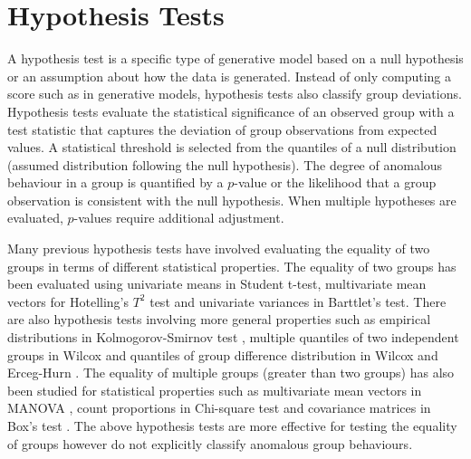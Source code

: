 \section{Hypothesis Tests} 
\label{Sec:H}
 A hypothesis test is a specific type of generative model based on a null hypothesis or an assumption about how the data is generated. Instead of only computing a score such as in generative models, hypothesis tests also classify group deviations.  Hypothesis tests evaluate the statistical significance of an observed group with  a test statistic that captures the deviation of group observations from expected values. A statistical threshold is selected from the quantiles of a null distribution (assumed distribution following the null hypothesis).   The degree of anomalous behaviour in a group is quantified by a $p$-value or the likelihood that a group  observation is consistent with the null hypothesis. When multiple hypotheses are evaluated,  $p$-values require additional adjustment. 

 Many previous hypothesis tests have involved evaluating the equality of two groups in terms of different statistical properties. The equality of two groups has been evaluated using univariate means  in Student t-test,  multivariate mean vectors for Hotelling's $T^2$ test and univariate variances in  Barttlet's test.  There are also hypothesis tests involving more general properties such as empirical distributions in Kolmogorov-Smirnov test \cite{KStest}, multiple quantiles of two independent groups in Wilcox \cite{Wilcox1995} and quantiles of group difference distribution in Wilcox and Erceg-Hurn \cite{Wilcox2012}. The equality of multiple groups (greater than two groups) has also been studied for statistical properties such as multivariate mean vectors in MANOVA \cite{borgen1978uses},  count proportions in Chi-square test \cite{kass1980exploratory}  and covariance matrices in Box's test \cite{box1954some}. The above hypothesis tests are more effective for testing the equality of groups  however  do not explicitly classify anomalous  group behaviours. %
 
